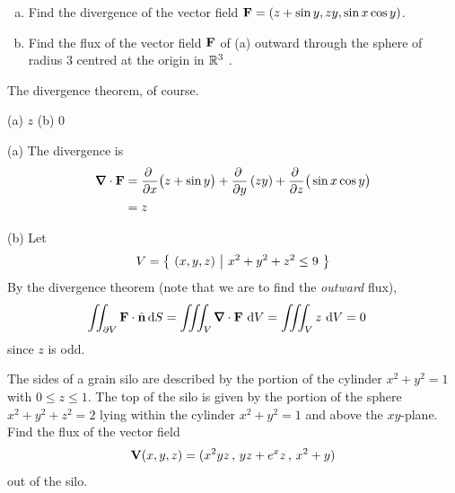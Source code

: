 \begin{question}[M317 2012D] %

\begin{enumerate}[(a)]
\item
Find the divergence of the vector field $\mathbf{F} = (z + \sin y, zy, \sin x \cos y)$.
\item
Find the flux of the vector field $\mathbf{F}$ of (a) outward through the sphere of 
radius $3$ centred at the origin in $\mathbb{R}^3$ .
\end{enumerate}
\end{question}

\begin{hint} 
The divergence theorem, of course.
\end{hint}

\begin{answer} 
(a) $z$\qquad
(b) $0$
\end{answer}

\begin{solution} (a)
The divergence is
\begin{align*}
\vnabla\cdot\vF &= 
    \pdiff{}{x}\big(z+\sin y\big)
     +\pdiff{}{y}\left(zy\right)
     +\pdiff{}{z}\big(\sin x\cos y\big) \\
   &=   z
\end{align*}

\noindent (b) Let
\begin{align*}
V=\big\{ \ (x,y,z)\ \big|\ x^2+y^2+z^2\le 9\ \big\}
\end{align*}
By the divergence theorem (note that we are to find the \emph{outward} 
flux),
\begin{align*}
\dblInt_{\partial V}  \vF\cdot\hn\,\dee{S}
&= \tripInt_V \vnabla\cdot \vF\ \dee{V} 
= \tripInt_V z\ \dee{V} 
= 0
\end{align*}
since $z$ is odd.
\end{solution}

\begin{question}
The sides of a grain silo are described by the portion of the 
cylinder $x^2 + y^2 = 1$ with $0 \le z\le 1$. The top of the silo is 
given by the portion of the sphere $x^2+ y^2+ z^2 = 2$ lying within the 
cylinder $x^2 + y^2 = 1$ and above the $xy$-plane. Find the flux of the vector field
\begin{equation*}
\mathbf{V}(x,y,z) = (x^2yz\,,\, yz+e^xz\,,\, x^2+y ) 
\end{equation*}
out of the silo. 
\end{question}

